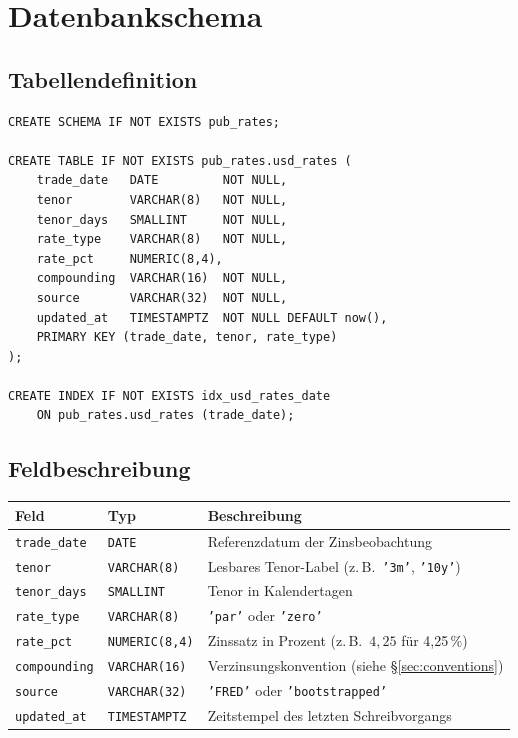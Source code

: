 \documentclass[11pt, a4paper]{article}
\begin{document}
\section{Datenbankschema}

\subsection{Tabellendefinition}

\begin{lstlisting}[style=sql]
CREATE SCHEMA IF NOT EXISTS pub_rates;

CREATE TABLE IF NOT EXISTS pub_rates.usd_rates (
    trade_date   DATE         NOT NULL,
    tenor        VARCHAR(8)   NOT NULL,
    tenor_days   SMALLINT     NOT NULL,
    rate_type    VARCHAR(8)   NOT NULL,
    rate_pct     NUMERIC(8,4),
    compounding  VARCHAR(16)  NOT NULL,
    source       VARCHAR(32)  NOT NULL,
    updated_at   TIMESTAMPTZ  NOT NULL DEFAULT now(),
    PRIMARY KEY (trade_date, tenor, rate_type)
);

CREATE INDEX IF NOT EXISTS idx_usd_rates_date
    ON pub_rates.usd_rates (trade_date);
\end{lstlisting}

\subsection{Feldbeschreibung}

\begin{tabular}{lll}
  \toprule
  Feld & Typ & Beschreibung \\
  \midrule
  \texttt{trade\_date}  & \texttt{DATE}        & Referenzdatum der Zinsbeobachtung \\
  \texttt{tenor}        & \texttt{VARCHAR(8)}  & Lesbares Tenor-Label (z.\,B.\ \texttt{'3m'}, \texttt{'10y'}) \\
  \texttt{tenor\_days}  & \texttt{SMALLINT}    & Tenor in Kalendertagen \\
  \texttt{rate\_type}   & \texttt{VARCHAR(8)}  & \texttt{'par'} oder \texttt{'zero'} \\
  \texttt{rate\_pct}    & \texttt{NUMERIC(8,4)}& Zinssatz in Prozent (z.\,B.\ $4{,}25$ für 4,25\,\%) \\
  \texttt{compounding}  & \texttt{VARCHAR(16)} & Verzinsungskonvention (siehe \S\ref{sec:conventions}) \\
  \texttt{source}       & \texttt{VARCHAR(32)} & \texttt{'FRED'} oder \texttt{'bootstrapped'} \\
  \texttt{updated\_at}  & \texttt{TIMESTAMPTZ} & Zeitstempel des letzten Schreibvorgangs \\
  \bottomrule
\end{tabular}
\end{document}
